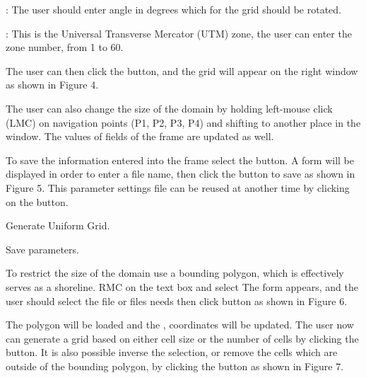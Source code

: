 \documentclass[letterpaper,10pt,english]{sphinxmanual}
\begin{document}
: The user should enter angle in degrees which for the
grid should be rotated.

: This is the Universal Transverse Mercator (UTM) zone, the
user can enter the zone number, from 1 to 60.

The user can then click the  button, and the grid will appear
on the right window as shown in Figure 4.

The user can also change the size of the domain by holding left-mouse
click (LMC) on navigation points (P1, P2, P3, P4) and shifting to
another place in the window. The values of fields of the  frame are updated as well.

To save the information entered into the  frame
select the  button. A  form will be displayed
in order to enter a file name, then click the  button to save as
shown in Figure 5. This parameter settings file can be reused at another
time by clicking on the  button.


 Generate Uniform Grid.


 Save parameters.

To restrict the size of the domain use a bounding polygon, which is
effectively serves as a shoreline. RMC on the  text
box and select  The  form appears, and the user should
select the file or files needs then click  button as shown in
Figure 6.

The polygon will be loaded and the , 
coordinates will be updated. The user now can generate a grid based on
either cell size or the number of cells by clicking the 
button. It is also possible inverse the selection, or remove the cells
which are outside of the bounding polygon, by clicking the 
button as shown in Figure 7.

\end{document}
